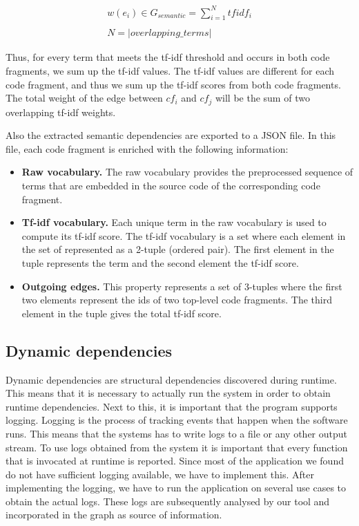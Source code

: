 \begin{equation}
    \begin{split}
        w(e_i) \in G_{semantic} = \sum_{i=1}^{N} tfidf_{i}\\\\
        N = |overlapping\_terms|
    \end{split}
\end{equation}

\noindent
Thus, for every term that meets the tf-idf threshold and occurs in both code fragments, we sum up the tf-idf values. The tf-idf values are different for each code fragment, and thus we sum up the tf-idf scores from both code fragments. The total weight of the edge between $cf_i$ and $cf_j$ will be the sum of two overlapping tf-idf weights. \par
Also the extracted semantic dependencies are exported to a JSON file. In this file, each code fragment is enriched with the following information:

\begin{itemize}
    \item \textbf{Raw vocabulary.} The raw vocabulary provides the preprocessed sequence of terms that are embedded in the source code of the corresponding code fragment.
    \item \textbf{Tf-idf vocabulary.} Each unique term in the raw vocabulary is used to compute its tf-idf score. The tf-idf vocabulary is a set where each element in the set of represented as a 2-tuple (ordered pair). The first element in the tuple represents the term and the second element the tf-idf score.
    \item \textbf{Outgoing edges.} This property represents a set of 3-tuples where the first two elements represent the ids of two top-level code fragments. The third element in the tuple gives the total tf-idf score.
\end{itemize}

\subsection{Dynamic dependencies}
Dynamic dependencies are structural dependencies discovered during runtime. This means that it is necessary to actually run the system in order to obtain runtime dependencies. Next to this, it is important that the program supports logging. Logging is the process of tracking events that happen when the software runs. This means that the systems has to write logs to a file or any other output stream. To use logs obtained from the system it is important that every function that is invocated at runtime is reported. Since most of the application we found do not have sufficient logging available, we have to implement this. After implementing the logging, we have to run the application on several use cases to obtain the actual logs. These logs are subsequently analysed by our tool and incorporated in the graph as source of information. 

